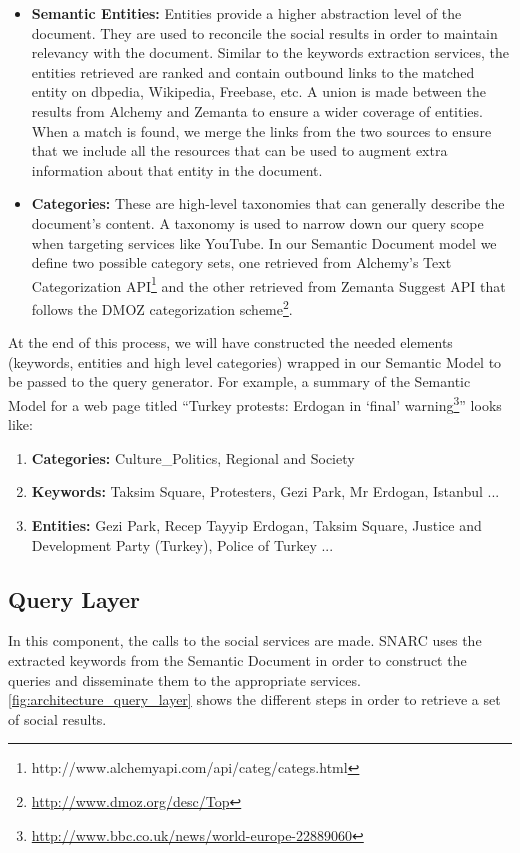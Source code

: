 \begin{enumerate}
\begin{itemize}
\item {\bf Semantic Entities:} Entities provide a higher abstraction level of the document. They are used to reconcile the social results in order to maintain relevancy with the document. Similar to the keywords extraction services, the entities retrieved are ranked and contain outbound links to the matched entity on dbpedia, Wikipedia, Freebase, etc. A union is made between the results from Alchemy and Zemanta to ensure a wider coverage of entities. When a match is found, we merge the links from the two sources to ensure that we include all the resources that can be used to augment extra information about that entity in the document.
\item {\bf Categories:} These are high-level taxonomies that can generally describe the document's content. A taxonomy is used to narrow down our query scope when targeting services like YouTube. In our Semantic Document model we define two possible category sets, one retrieved from Alchemy's Text Categorization API\footnote{http://www.alchemyapi.com/api/categ/categs.html} and the other retrieved from Zemanta Suggest API that follows the DMOZ categorization scheme\footnote{\url{http://www.dmoz.org/desc/Top}}.
\end{itemize}
\end{enumerate}

At the end of this process, we will have constructed the needed elements (keywords, entities and high level categories) wrapped in our Semantic Model to be passed to the query generator. For example, a summary of the Semantic Model for a web page titled ``Turkey protests: Erdogan in `final' warning\footnote{\url{http://www.bbc.co.uk/news/world-europe-22889060}}'' looks like:
\begin{enumerate}
\item {\bf Categories:} Culture\_Politics, Regional and Society
\item {\bf Keywords:} Taksim Square, Protesters, Gezi Park, Mr Erdogan, Istanbul ...
\item {\bf Entities:} Gezi Park, Recep Tayyip Erdogan, Taksim Square, Justice and Development Party (Turkey), Police of Turkey ...
\end{enumerate}

\subsection{Query Layer}
In this component, the calls to the social services are made. SNARC uses the extracted keywords from the Semantic Document in order to construct the queries and disseminate them to the appropriate services. \ref{fig:architecture_query_layer} shows the different steps in order to retrieve a set of social results.

